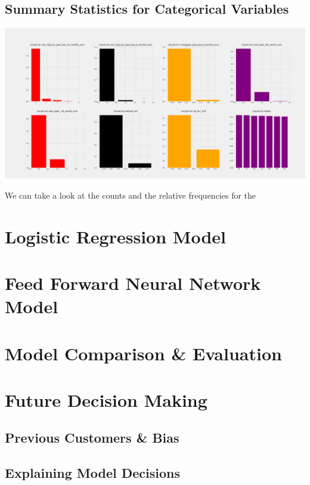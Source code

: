 \documentclass[12pt]{article}
\begin{document}
	\subsection{Summary Statistics for Categorical Variables}
	
	\begin{center}
		\includegraphics[scale=0.15]{../notebooks/counts.png}
	\end{center}
	
	We can take a look at the counts and the relative frequencies for the 

	
	\section{Logistic Regression Model}
	
	\section{Feed Forward Neural Network Model}
	
	\section{Model Comparison \& Evaluation}
	
	\section{Future Decision Making}
	
	\subsection{Previous Customers \& Bias}
	
	\subsection{Explaining Model Decisions}
	
\end{document}
